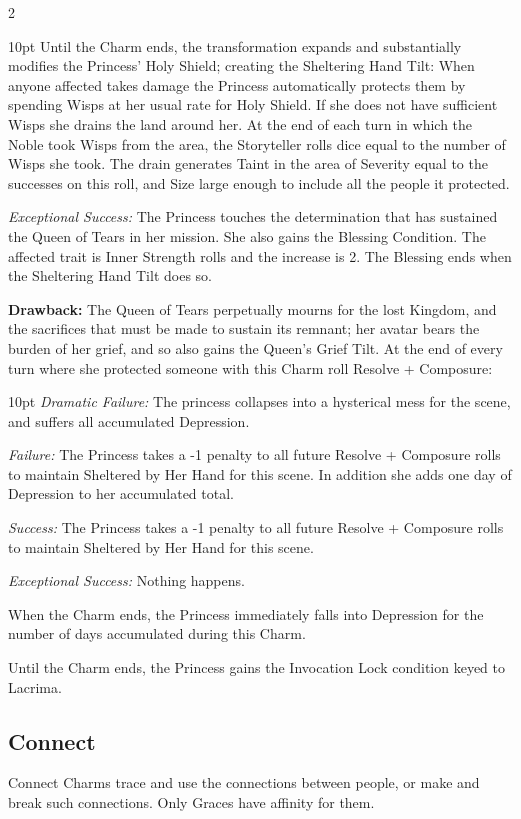 \begin{multicols}{2}
\begin{myindentpar}{10pt}
    Until the Charm ends, the transformation expands and substantially modifies the Princess' Holy Shield; creating the Sheltering Hand Tilt: When anyone affected takes damage the Princess automatically protects them by spending Wisps at her usual rate for Holy Shield. If she does not have sufficient Wisps she drains the land around her. At the end of each turn in which the Noble took Wisps from the area, the Storyteller rolls dice equal to the number of Wisps she took. The drain generates Taint in the area of Severity equal to the successes on this roll, and Size large enough to include all the people it protected.
    

    \emph{Exceptional Success:} The Princess touches the determination that has sustained the Queen of Tears in her mission. She also gains the Blessing Condition. The affected trait is Inner Strength rolls and the increase is 2. The Blessing ends when the Sheltering Hand Tilt does so.\end{myindentpar}

\noindent \textbf{Drawback:} The Queen of Tears perpetually mourns for the lost Kingdom, and the sacrifices that must be made to sustain its remnant; her avatar bears the burden of her grief, and so also gains the Queen's Grief Tilt. At the end of every turn where she protected someone with this Charm roll Resolve + Composure: 

   \begin{myindentpar}{10pt}   \emph{Dramatic Failure:} The princess collapses into a hysterical mess for the scene, and suffers all accumulated Depression.
    
    \emph{Failure:} The Princess takes a -1 penalty to all future Resolve + Composure rolls to maintain Sheltered by Her Hand for this scene. In addition she adds one day of Depression to her accumulated total. 

    \emph{Success:} The Princess takes a -1 penalty to all future Resolve + Composure rolls to maintain Sheltered by Her Hand for this scene.

    \emph{Exceptional Success:} Nothing happens. \end{myindentpar}

When the Charm ends, the Princess immediately falls into Depression for the number of days accumulated during this Charm. 
    
Until the Charm ends, the Princess gains the Invocation Lock condition keyed to Lacrima.

\subsection*{Connect}
\label{subsec:Connect}
Connect Charms trace and use the connections between people, or make and break such connections. Only Graces have affinity for them.


\end{multicols}

